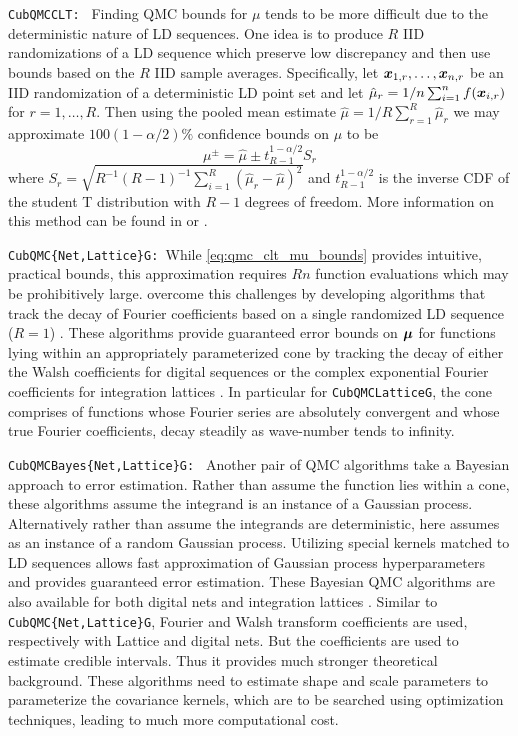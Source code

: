 \documentclass{article}[12pt]
\begin{document}
\texttt{CubQMCCLT: } Finding QMC bounds for $\mu$ tends to be more difficult due to the deterministic nature of LD sequences. One idea is to produce $R$ IID randomizations of a LD sequence which preserve low discrepancy and then use bounds based on the $R$ IID sample averages. Specifically, let $\boldsymbol{x}_{1,r},\dots,\boldsymbol{x}_{n,r}$ be an IID randomization of a deterministic LD point set and let $\hat{\mu}_r = 1/n \sum_{i=1}^n f(\boldsymbol{x}_{i,r})$ for $r=1,\dots,R$. Then using the pooled mean estimate $\hat{\mu} = 1/R \sum_{r=1}^R \hat{\mu}_r$ we may approximate $100(1-\alpha/2)\%$ confidence bounds on $\mu$ to be
\begin{equation}
    \mu^\pm = \hat{\mu} \pm t_{R-1}^{1-\alpha/2}S_r
    \label{eq:qmc_clt_mu_bounds}
\end{equation}
where $S_r = \sqrt{R^{-1}(R-1)^{-1}\sum_{i=1}^R(\hat{\mu}_r - \hat{\mu})^2}$ and $t_{R-1}^{1-\alpha/2}$ is the inverse CDF of the student T distribution with $R-1$ degrees of freedom. More information on this method can be found in \cite[Chapter 17]{mcbook} or \cite{qmc4pde_preprint}.

\texttt{CubQMC\{Net,Lattice\}G: }While \eqref{eq:qmc_clt_mu_bounds} provides intuitive, practical bounds, this approximation requires $Rn$ function evaluations which may be prohibitively large.  \citeauthor{cubqmclattice} overcome this challenges by developing algorithms that track the decay of Fourier coefficients based on a single randomized LD sequence ($R=1$) \cite{adaptive_qmc}. These algorithms provide guaranteed error bounds on $\boldsymbol{\mu}$ for functions lying within an appropriately parameterized cone by tracking the decay of either the Walsh coefficients for digital sequences \cite{cubqmcsobol} or the complex exponential Fourier coefficients for integration lattices \cite{cubqmclattice}. In particular for \texttt{CubQMCLatticeG}, the cone comprises of functions whose Fourier series are absolutely convergent and whose true Fourier coefficients, decay steadily as wave-number tends to infinity.


\texttt{CubQMCBayes\{Net,Lattice\}G: } Another pair of QMC algorithms take a Bayesian approach to error estimation. Rather than assume the function lies within a cone, these algorithms assume the integrand is an instance of a Gaussian process. Alternatively rather than assume the integrands are deterministic, here assumes as an instance of a random Gaussian process.  Utilizing special kernels matched to LD sequences allows fast approximation of Gaussian process hyperparameters and provides guaranteed error estimation. These Bayesian QMC algorithms are also available for both digital nets  and integration lattices  \cite{cubqmcbayeslattice}. Similar to \texttt{CubQMC\{Net,Lattice\}G}, Fourier and Walsh transform coefficients are used, respectively with Lattice and digital nets. But the coefficients are used to estimate credible intervals. Thus it provides much stronger theoretical background. These algorithms need to estimate shape and scale parameters to parameterize the covariance kernels, which are to be searched using optimization techniques, leading to much more computational cost. 
\end{document}
